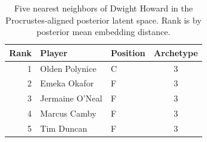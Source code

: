 \begin{table}[htbp]
  \centering\small
  \begin{tabular}{rllc}
    \toprule
    Rank & Player & Position & Archetype \\
    \midrule
    1 & Olden Polynice & C & 3 \\
    2 & Emeka Okafor & F & 3 \\
    3 & Jermaine O'Neal & F & 3 \\
    4 & Marcus Camby & F & 3 \\
    5 & Tim Duncan & F & 3 \\
    \bottomrule
  \end{tabular}
  \caption{Five nearest neighbors of Dwight Howard in the Procrustes-aligned posterior latent space. Rank is by posterior mean embedding distance.}
  \label{tab:Dwight_Howard_neighbors}
\end{table}

